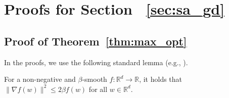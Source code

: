 \documentclass[11pt]{article}
\newcommand{\R}{\mathbb{R}}
\begin{document}
\section{Proofs for Section ~\ref{sec:sa_gd}}\label{sec:proof_sa_gd}

\subsection{Proof of Theorem~\ref{thm:max_opt}}\label{sec:proof_max_opt}

In the proofs, we use the following standard lemma (e.g., \cite{srebro2010smoothness}).
\begin{lemma} \label{lem:2L_descent}  
For a non-negative and $\beta$-smooth $f:\R^d \to \R$, it holds that $\|\nabla
f(w)\|^2 \leq 2\beta f(w)$ for all $w\in \R^d$.
\end{lemma}
\end{document}

